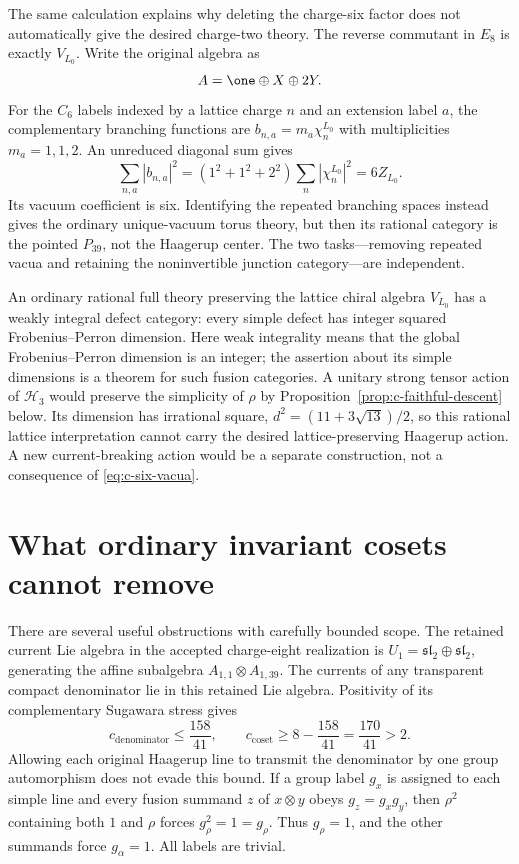 The same calculation explains why deleting the charge-six factor does
not automatically give the desired charge-two theory. The reverse
commutant in $E_8$ is exactly $V_{L_0}$. Write the original algebra
as
\[
 A=\one\oplus X\oplus2Y.
\]
For the $C_6$ labels indexed by a lattice charge $n$ and an extension
label $a$, the complementary branching functions are
$b_{n,a}=m_a\chi_n^{L_0}$ with multiplicities $m_a=1,1,2$.
An unreduced diagonal sum gives
\begin{equation}\label{eq:c-six-vacua}
 \sum_{n,a}|b_{n,a}|^2
   =(1^2+1^2+2^2)\sum_n|\chi_n^{L_0}|^2=6Z_{L_0}.
\end{equation}
Its vacuum coefficient is six. Identifying the repeated branching
spaces instead gives the ordinary unique-vacuum torus theory, but
then its rational category is the pointed $P_{39}$, not the
Haagerup center. The two tasks---removing repeated vacua and retaining
the noninvertible junction category---are independent.

An ordinary rational full theory preserving the lattice chiral algebra
$V_{L_0}$ has a weakly integral defect category: every simple defect
has integer squared Frobenius--Perron dimension. Here weak integrality
means that the global Frobenius--Perron dimension is an integer;
the assertion about its simple dimensions is a theorem for such
fusion categories. A unitary strong
tensor action of $\mathcal H_3$ would preserve the simplicity of
$\rho$ by Proposition~\ref{prop:c-faithful-descent} below. Its
dimension has irrational square, $d^2=(11+3\sqrt{13})/2$,
so this rational lattice interpretation cannot carry the desired
lattice-preserving Haagerup action. A new current-breaking action
would be a separate construction, not a consequence of
\eqref{eq:c-six-vacua}.

\section{What ordinary invariant cosets cannot remove}

There are several useful obstructions with carefully bounded scope.
The retained current Lie algebra in the accepted charge-eight
realization is $U_1=\mathfrak{sl}_2\oplus\mathfrak{sl}_2$, generating
the affine subalgebra $A_{1,1}\otimes A_{1,39}$. The currents of any
transparent compact denominator lie in this retained Lie algebra.
Positivity of its complementary
Sugawara stress gives
\[
 c_{\mathrm{denominator}}\leq\frac{158}{41},\qquad
 c_{\mathrm{coset}}\geq8-\frac{158}{41}=\frac{170}{41}>2.
\]
Allowing each original Haagerup line to transmit the denominator by
one group automorphism does not evade this bound. If a group label
$g_x$ is assigned to each simple line and every fusion summand $z$
of $x\otimes y$ obeys $g_z=g_xg_y$, then $\rho^2$ containing
both $1$ and $\rho$ forces
$g_\rho^2=1=g_\rho$. Thus $g_\rho=1$, and the other summands
force $g_\alpha=1$. All labels are trivial.

